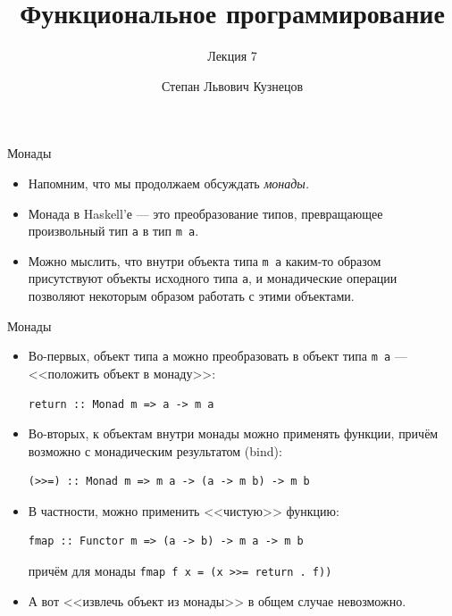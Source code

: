 \documentclass[xcolor=dvipsnames]{beamer}
\begin{document}
\title{Функциональное программирование}
\subtitle{Лекция 7}
\date{}
\author{Степан Львович Кузнецов}

\maketitle

\begin{frame}{Монады}
 
 \begin{itemize}[<+->]
  \item Напомним, что мы продолжаем обсуждать {\em монады.}
  \item Монада в Haskell'е --- это преобразование типов, превращающее произвольный тип {\tt a} в тип {\tt m a}.
  \item Можно мыслить, что внутри объекта типа {\tt m a} каким-то образом присутствуют объекты исходного типа {\tt a}, и монадические операции позволяют некоторым образом работать с этими объектами. 
 \end{itemize}

\end{frame}

\begin{frame}[fragile]{Монады}
 \begin{itemize}[<+->]
  \item Во-первых, объект типа {\tt a} можно преобразовать в объект типа {\tt m a} --- <<положить объект в монаду>>:
\begin{verbatim}
return :: Monad m => a -> m a
\end{verbatim}
  \item Во-вторых, к объектам внутри монады можно применять функции, причём возможно с монадическим результатом (bind):
\begin{verbatim}
(>>=) :: Monad m => m a -> (a -> m b) -> m b
\end{verbatim}
  \item В частности, можно применить <<чистую>> функцию:
\begin{verbatim}
fmap :: Functor m => (a -> b) -> m a -> m b
\end{verbatim}
причём для монады {\tt fmap f x = (x >{>}= return . f))}
\item А вот <<извлечь объект из монады>> в общем случае невозможно.


 \end{itemize}

 
\end{frame}
\end{document}
